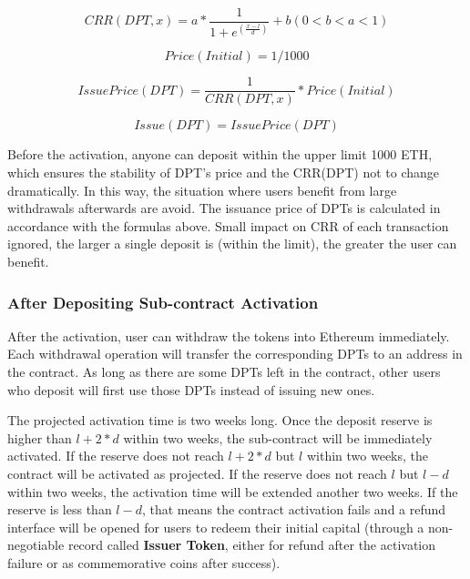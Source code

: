 \documentclass[a4paper, 10pt, conference]{ieeeconf} %
\begin{document}
\begin{equation}\label{CRR1}
{CRR(DPT, x) = a * \frac{1}{1+e^(\frac{x - l}{d})} + b (0 < b < a < 1)}
\end{equation}

\begin{equation}\label{Price2}
{Price(Initial) = 1/1000}
\end{equation}

\begin{equation}\label{IssuePrice3}
{IssuePrice(DPT) = \frac{1}{CRR(DPT, x)} * Price(Initial)}
\end{equation}

\begin{equation}\label{Issue6}
{Issue(DPT) = IssuePrice(DPT)}
\end{equation}

Before the activation, anyone can deposit within the upper limit 1000 ETH, which ensures the stability of DPT's price and the CRR(DPT) not to change dramatically. In this way, the situation where users benefit from large withdrawals afterwards are avoid. The issuance price of DPTs is calculated in accordance with the formulas above. Small impact on CRR of each transaction ignored, the larger a single deposit is (within the limit), the greater the user can benefit.

\subsubsection{After Depositing Sub-contract Activation}
After the activation, user can withdraw the tokens into Ethereum immediately. Each withdrawal operation will transfer the corresponding DPTs to an address in the contract. As long as there are some DPTs left in the contract, other users who deposit will first use those DPTs instead of issuing new ones. 

The projected activation time is two weeks long. Once the deposit reserve is higher than ${l + 2 * d}$ within two weeks, the sub-contract will be immediately activated. If the reserve does not reach ${l + 2 * d}$ but $l$ within two weeks, the contract will be activated as projected. If the reserve does not reach $l$ but ${l - d}$ within two weeks, the activation time will be extended another two weeks. If the reserve is less than ${l - d}$, that means the contract activation fails and a refund interface will be opened for users to redeem their initial capital (through a non-negotiable record called \textbf{Issuer Token}, either for refund after the activation failure or as commemorative coins after success).
\end{document}
